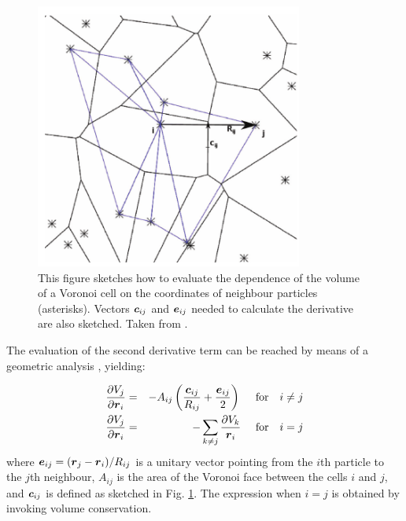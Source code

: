 \documentclass[a4,useAMS,usenatbib,usegraphicx,12pt]{article}
\begin{document}
\begin{figure}[h]
\centering

  \includegraphics[trim = 0mm 0mm 0mm 0mm, clip, keepaspectratio=true,
  width=0.25\textheight]{./figures/VoronoiVolume.png}
  
  \caption{\small This figure sketches how to evaluate the dependence of the 
  volume of a Voronoi cell on the coordinates of neighbour particles 
  (asterisks). Vectors $\boldsymbol{ c }_{ij}$ and $\boldsymbol{ e }_{ij}$ needed to calculate 
  the derivative are also sketched. Taken from \citet{Hess10}. }

  \label{fig:VoronoiVolume}

\end{figure}

The evaluation of the second derivative term can be reached by means of a 
geometric analysis \citep{Serrano01}, yielding:

\begin{eqnarray}
\nonumber{}
\frac{\partial V_j}{\partial \boldsymbol{ r }_i} &=& -A_{ij}\left(  \frac{\boldsymbol{ c }_{ij}}{R_{ij}}
+ \frac{\boldsymbol{ e }_{ij}}{2}  \right) \ \ \ \ \mbox{for}\ \ \ i\neq j \\
\label{VoronoiVolume}
\frac{\partial V_j}{\partial \boldsymbol{ r }_i} &=& -\sum_{k\neq j}\frac{\partial V_k}{\boldsymbol{ r }_i} \ \ \ \ \mbox{for}\ \ \ i=j
\end{eqnarray}
where $\boldsymbol{ e }_{ij} = (\boldsymbol{ r }_j - \boldsymbol{ r }_i )/R_{ij}$ is a unitary vector 
pointing from the $i$th particle to the $j$th neighbour, $A_{ij}$ is the area 
of the Voronoi face between the cells $i$ and $j$, and $\boldsymbol{ c }_{ij}$ is defined
as sketched in Fig. \ref{fig:VoronoiVolume}. The expression when $i=j$ is 
obtained by invoking volume conservation.
\end{document}
